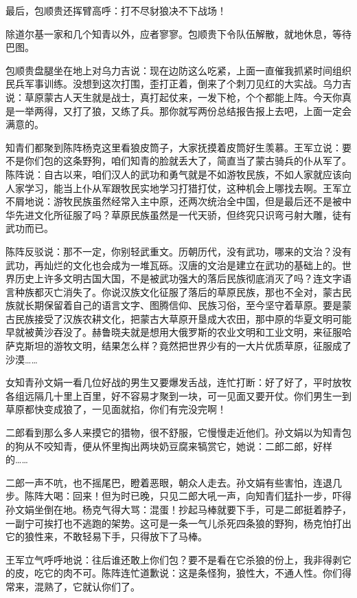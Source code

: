 \par 最后，包顺贵还挥臂高呼：打不尽豺狼决不下战场！
\par 除道尔基一家和几个知青以外，应者寥寥。包顺贵下令队伍解散，就地休息，等待巴图。
\par 包顺贵盘腿坐在地上对乌力吉说：现在边防这么吃紧，上面一直催我抓紧时间组织民兵军事训练。没想到这次打围，歪打正着，倒来了个刺刀见红的大实战。乌力吉说：草原蒙古人天生就是战士，真打起仗来，一发下枪，个个都能上阵。今天你真是一举两得，又打了狼，又练了兵。那你就写两份总结报告报上去吧，上面一定会满意的。
\par 知青们都聚到陈阵杨克这里看狼皮筒子，大家抚摸着皮筒好生羡慕。王军立说：要不是你们包的这条野狗，咱们知青的脸就丢大了，简直当了蒙古骑兵的仆从军了。陈阵说：自古以来，咱们汉人的武功和勇气就是不如游牧民族，不如人家就应该向人家学习，能当上仆从军跟牧民实地学习打猎打仗，这种机会上哪找去啊。王军立不屑地说：游牧民族虽然经常入主中原，还两次统治全中国，但是最后还不是被中华先进文化所征服了吗？草原民族虽然是一代天骄，但终究只识弯弓射大雕，徒有武功而已。
\par 陈阵反驳说：那不一定，你别轻武重文。历朝历代，没有武功，哪来的文治？没有武功，再灿烂的文化也会成为一堆瓦砾。汉唐的文治是建立在武功的基础上的。世界历史上许多文明古国大国，不是被武功强大的落后民族彻底消灭了吗？连文字语言种族都灭亡消失了。你说汉族文化征服了落后的草原民族，那也不全对，蒙古民族就长期保留着自己的语言文字、图腾信仰、民族习俗，至今坚守着草原。要是蒙古民族接受了汉族农耕文化，把蒙古大草原开垦成大农田，那中原的华夏文明可能早就被黄沙吞没了。赫鲁晓夫就是想用大俄罗斯的农业文明和工业文明，来征服哈萨克斯坦的游牧文明，结果怎么样？竟然把世界少有的一大片优质草原，征服成了沙漠……
\par 女知青孙文娟一看几位好战的男生又要爆发舌战，连忙打断：好了好了，平时放牧各组远隔几十里上百里，好不容易才聚到一块，可一见面又要开仗。你们男生一到草原都快变成狼了，一见面就掐，你们有完没完啊！
\par 二郎看到那么多人来摸它的猎物，很不舒服，它慢慢走近他们。孙文娟以为知青包的狗从不咬知青，便从怀里掏出两块奶豆腐来犒赏它，她说：二郎二郎，好样的……
\par 二郎一声不吭，也不摇尾巴，瞪着恶眼，朝众人走去。孙文娟有些害怕，连退几步。陈阵大喝：回来！但为时已晚，只见二郎大吼一声，向知青们猛扑一步，吓得孙文娟坐倒在地。杨克气得大骂：混蛋！抄起马棒就要下手，可是二郎挺着脖子，一副宁可挨打也不逃跑的架势。这可是一条一气儿杀死四条狼的野狗，杨克怕打出它的狼性来，不敢轻易下手，只得放下了马棒。
\par 王军立气呼呼地说：往后谁还敢上你们包？要不是看在它杀狼的份上，我非得剥它的皮，吃它的肉不可。陈阵连忙道歉说：这是条怪狗，狼性大，不通人性。你们得常来，混熟了，它就认你们了。
